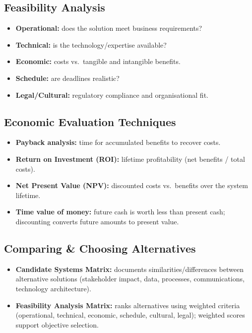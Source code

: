 \documentclass[hidelinks]{article}
\begin{document}
\subsection{Feasibility Analysis}
\begin{itemize}
  \item \textbf{Operational:} does the solution meet business requirements?
  \item \textbf{Technical:} is the technology/expertise available?
  \item \textbf{Economic:} costs vs.\ tangible and intangible benefits.
  \item \textbf{Schedule:} are deadlines realistic?
  \item \textbf{Legal/Cultural:} regulatory compliance and organisational fit.
\end{itemize}

\subsection{Economic Evaluation Techniques}
\begin{itemize}
  \item \textbf{Payback analysis:} time for accumulated benefits to recover costs.
  \item \textbf{Return on Investment (ROI):} lifetime profitability (net benefits / total costs).
  \item \textbf{Net Present Value (NPV):} discounted costs vs.\ benefits over the system lifetime.
  \item \textbf{Time value of money:} future cash is worth less than present cash; discounting
        converts future amounts to present value.
\end{itemize}

\noindent{\color{capri}
\[ \text{Present Value: } PV = \frac{FV}{(1+i)^{n}}
   \qquad\qquad \text{Discount factor} = \frac{1}{(1+i)^{n}} \]
\[ \text{ROI} = \frac{\text{Total benefits} - \text{Total costs}}{\text{Total costs}}\times 100\% \]
\[ \text{NPV} = \sum_{t=0}^{n}\frac{B_t - C_t}{(1+i)^{t}} \qquad\text{(accept the project if } \text{NPV} > 0\text{)} \]
}

\subsection{Comparing \& Choosing Alternatives}
\begin{itemize}
  \item \textbf{Candidate Systems Matrix:} documents similarities/differences between alternative
        solutions (stakeholder impact, data, processes, communications, technology architecture).
  \item \textbf{Feasibility Analysis Matrix:} ranks alternatives using weighted criteria
        (operational, technical, economic, schedule, cultural, legal); weighted scores support
        objective selection.
\end{itemize}
\end{document}
